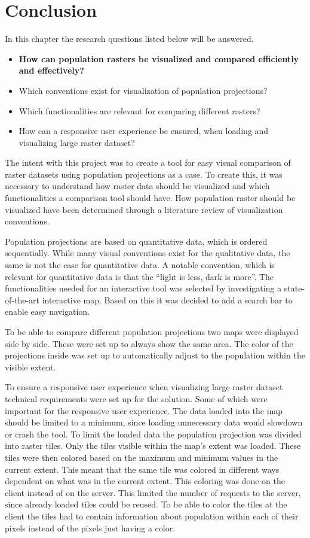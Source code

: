 \chapter{Conclusion}
In this chapter the research questions listed below will be answered.

\begin{itemize}
	\item \textbf{How can population rasters be visualized and compared efficiently and effectively?}
	\item Which conventions exist for visualization of population projections?
	\item Which functionalities are relevant for comparing different rasters?
	\item How can a responsive user experience be ensured, when loading and visualizing large raster dataset?
\end{itemize}


The intent with this project was to create a tool for easy visual comparison of raster datasets using population projections as a case. To create this, it was necessary to understand how raster data should be visualized and which functionalities a comparison tool should have.
How population raster should be visualized have been determined through a literature review of visualization conventions. 	

Population projections are based on quantitative data, which is ordered sequentially. While many visual conventions exist for the qualitative data, the same is not the case for quantitative data. A notable convention, which is relevant for quantitative data is that the “light is less, dark is more”.
The functionalities needed for an interactive tool was selected by investigating a state-of-the-art interactive map. Based on this it was decided to add a search bar to enable easy navigation. 

To be able to compare different population projections two maps were displayed side by side. These were set up to always show the same area. The color of the projections inside was set up to automatically adjust to the population within the visible extent.


To ensure a responsive user experience when visualizing large raster dataset technical requirements were set up for the solution. Some of which were important for the responsive user experience. The data loaded into the map should be limited to a minimum, since loading unnecessary data would slowdown or crash the tool. To limit the loaded data the population projection was divided into raster tiles. Only the tiles visible within the map’s extent was loaded. These tiles were then colored based on the maximum and minimum values in the current extent. This meant that the same tile was colored in different ways dependent on what was in the current extent. This coloring was done on the client instead of on the server.  This limited the number of requests to the server, since already loaded tiles could be reused. To be able to color the tiles at the client the tiles had to contain information about population within each of their pixels instead of the pixels just having a color.

